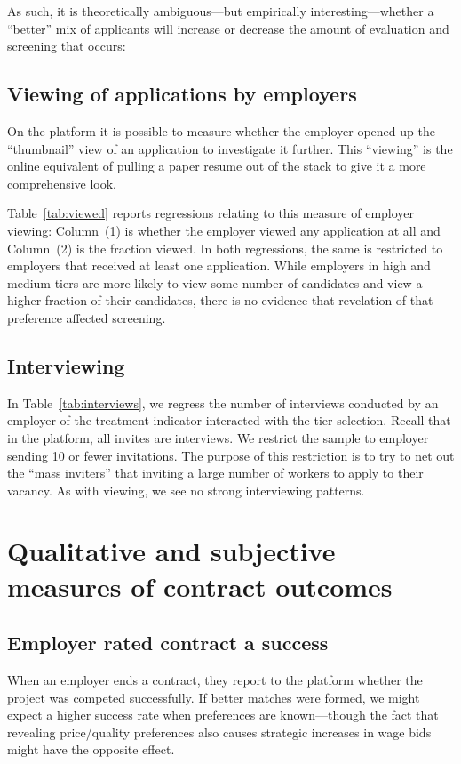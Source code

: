 As such, it is theoretically ambiguous---but empirically interesting---whether a ``better'' mix of applicants will increase or decrease the amount of evaluation and screening that occurs:

\subsection{Viewing of applications by employers}

On the platform it is possible to measure whether the employer opened up the ``thumbnail'' view of an application to investigate it further.
This ``viewing'' is the online equivalent of pulling a paper resume out of the stack to give it a more comprehensive look.

Table~\ref{tab:viewed} reports regressions relating to this measure of employer viewing:
Column~(1) is whether the employer viewed any application at all and Column~(2) is the fraction viewed.
In both regressions, the same is restricted to employers that received at least one application. 
While employers in high and medium tiers are more likely to view some number of candidates and view a higher fraction of their candidates, there is no evidence that revelation of that preference affected screening. 



\subsection{Interviewing} 
In Table~\ref{tab:interviews}, we regress the number of interviews conducted by an employer of the treatment indicator interacted with the tier selection. 
Recall that in the platform, all invites are interviews. 
We restrict the sample to employer sending 10 or fewer invitations. 
The purpose of this restriction is to try to net out the ``mass inviters'' that inviting a large number of workers to apply to their vacancy. 
As with viewing, we see no strong interviewing patterns.




\section{Qualitative and subjective measures of contract outcomes}

\subsection{Employer rated contract a success} 
When an employer ends a contract, they report to the platform whether the project was competed successfully. 
If better matches were formed, we might expect a higher success rate when preferences are known---though the fact that revealing price/quality preferences also causes strategic increases in wage bids might have the opposite effect. 


